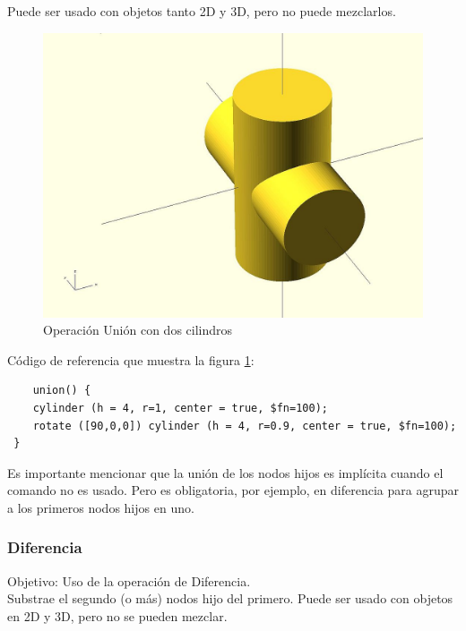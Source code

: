 \documentclass{article}
\begin{document}
Puede ser usado con objetos tanto 2D y 3D, pero no puede mezclarlos.\citep{WikiOpensCAD}\\

\begin{figure}[h!]
    \centering
    \includegraphics[scale=0.1]{Imagenes/Openscad_union.jpg}
    \caption{Operación Unión con dos cilindros}
    \label{fig:union_cilindros}
\end{figure}

Código de referencia que muestra la figura \ref{fig:union_cilindros}:\\

\begin{verbatim}
    union() {
 	cylinder (h = 4, r=1, center = true, $fn=100);
 	rotate ([90,0,0]) cylinder (h = 4, r=0.9, center = true, $fn=100);
 }
\end{verbatim}

Es importante mencionar que la unión de los nodos hijos es implícita cuando el comando no es usado. Pero es obligatoria, por ejemplo, en diferencia para agrupar a los primeros nodos hijos en uno.\\

\subsubsection{Diferencia}

Objetivo: Uso de la operación de Diferencia.\citep{OpenSCS}\\

Substrae el segundo (o más) nodos hijo del primero. Puede ser usado con objetos en 2D y 3D, pero no se pueden mezclar.\citep{WikiOpensCAD}\\
\end{document}

